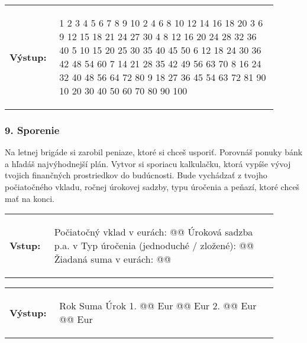 \begin{tabular}{@{}p{0.15\linewidth}p{0.75\linewidth}}
\textbf{\small Výstup:} &
\vspace{-3em}
\begin{code}
  1   2   3   4   5   6   7   8   9  10
  2   4   6   8  10  12  14  16  18  20
  3   6   9  12  15  18  21  24  27  30
  4   8  12  16  20  24  28  32  36  40
  5  10  15  20  25  30  35  40  45  50
  6  12  18  24  30  36  42  48  54  60
  7  14  21  28  35  42  49  56  63  70
  8  16  24  32  40  48  56  64  72  80
  9  18  27  36  45  54  63  72  81  90
 10  20  30  40  50  60  70  80  90 100
\end{code}
\end{tabular}
\vspace{-2em}


\subsubsection*{9. Sporenie}
Na letnej brigáde si zarobil peniaze, ktoré si chceš usporiť. Porovnáš ponuky bánk a hľadáš najvýhodnejší plán. Vytvor si sporiacu kalkulačku, ktorá vypíše vývoj tvojich finančných prostriedkov do budúcnosti. Bude vychádzať z tvojho počiatočného vkladu, ročnej úrokovej sadzby, typu úročenia a peňazí, ktoré chceš mať na konci.

\begin{tabular}{@{}p{0.15\linewidth}p{0.75\linewidth}}
\textbf{\small Vstup:} &
\vspace{-3em}
\begin{code}
Počiatočný vklad v eurách: @\fbox{\phantom{vstup}}@
Úroková sadzba p.a. v %
Typ úročenia (jednoduché / zložené): @\fbox{\phantom{vstup}}@
Žiadaná suma v eurách: @\fbox{\phantom{vstup}}@
\end{code}
\end{tabular}

\vspace{-2em}
\begin{tabular}{@{}p{0.15\linewidth}p{0.75\linewidth}}
\textbf{\small Výstup:} &
\vspace{-3em}
\begin{code}
Rok      Suma						Úrok
 1.		@\fbox{\phantom{vstup}}@ Eur	@\fbox{\phantom{vstup}}@ Eur
 2.		@\fbox{\phantom{vstup}}@ Eur	@\fbox{\phantom{vstup}}@ Eur
\end{code}
\end{tabular}
\vspace{-2em}
